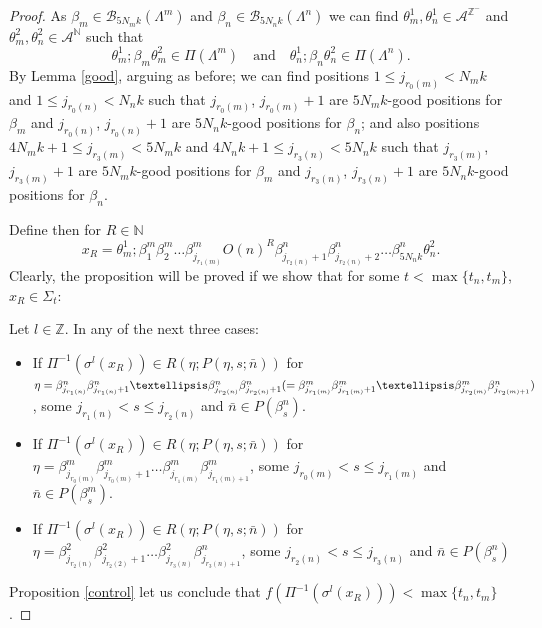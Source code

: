 \documentclass[10pt,a4paper]{amsart}
\begin{document}
\begin{proof}
As $\beta_m \in \mathcal{B}_{5N_m k}(\Lambda^{m})$ and $\beta_n \in \mathcal{B}_{5N_n k}(\Lambda^{n})$ we can find $\theta_m^{1}, \theta_n^{1}\in\mathcal{A}^{\mathbb{Z}^-}$ and $\theta_m^{2}, \theta_n^{2}\in\mathcal{A}^{\mathbb{N}}$ such that 
$$\theta_m^{1};\beta_m\theta_m^{2}\in \Pi(\Lambda^{m})\quad \mbox{and} \quad \theta_n^{1};\beta_n\theta_n^{2}\in \Pi(\Lambda^{n}).$$
By Lemma \ref{good}, arguing as before; we can find positions $1\leq j_{r_0(m)}< N_m k$ and $1\leq j_{r_0(n)}< N_n k$ such that $j_{r_0(m)}$, $j_{r_0(m)}+1$ are $5N_m k$-good positions for $\beta_m$ and $j_{r_0(n)}$, $j_{r_0(n)}+1$ are $5N_n k$-good positions for $\beta_n$; and also positions $4N_m k+1\leq j_{r_3(m)}< 5N_m k$ and $4N_n k+1\leq j_{r_3(n)}< 5N_n k$ such that $j_{r_3(m)}$, $j_{r_3(m)}+1$ are $5N_m k$-good positions for $\beta_m$ and $j_{r_3(n)}$, $j_{r_3(n)}+1$ are $5N_n k$-good positions for $\beta_n$.


Define then for $R\in \mathbb{N}$
$$x_R=\theta_m^{1};\beta^m_1\beta^m_2\dots\beta^m_{j_{r_1(m)}}O(n)^R \beta^n_{j_{r_2(n)}+1}\beta^n_{j_{r_2(n)}+2}\dots\beta^n_{5N_n k}\theta_n^{2}.$$
Clearly, the proposition will be proved if we show that for some $t<\max\{t_n,t_m\}$, $x_R\in \Sigma_{t}$:

Let $l\in \mathbb{Z}$. In any of the next three cases:

\begin{itemize}
    \item If $\Pi^{-1}(\sigma^l(x_R))\in R(\eta;P(\eta,s;\bar{n}))$ for $\eta= \beta^n_{j_{r_1(n)}}\beta^n_{j_{r_1(n)}+1}\dots \beta^n_{j_{r_2(n)}} \beta^n_{j_{r_2(n)}+1} (=\\ \beta^m_{j_{r_1(m)}}\beta^m_{j_{r_1(m)}+1}\dots \beta^m_{j_{r_2(m)}} \beta^n_{j_{r_2(m)+1}})$, some $j_{r_1(n)}< s \leq j_{r_2(n)}$ and  $\bar{n} \in P(\beta^n_s)$.
   
   \item If $\Pi^{-1}(\sigma^l(x_R))\in R(\eta;P(\eta,s;\bar{n}))$ for $\eta=\beta^m_{j_{r_0(m)}}\beta^m_{j_{r_0(m)}+1}\dots \beta^m_{j_{r_1(m)}} \beta^m_{j_{r_1(m)+1}}$, some $j_{r_0(m)}< s \leq j_{r_1(m)}$ and  $\bar{n} \in P(\beta^m_s)$.
    
  \item If $\Pi^{-1}(\sigma^l(x_R))\in R(\eta;P(\eta,s;\bar{n}))$ for $\eta=\beta^2_{j_{r_2(n)}}\beta^2_{j_{r_2(2)}+1}\dots \beta^2_{j_{r_3(n)}} \beta^n_{j_{r_3(n)+1}}$, some $j_{r_2(n)}< s \leq j_{r_3(n)}$ and  $\bar{n} \in P(\beta^n_s)$ 


\end{itemize}
Proposition \ref{control} let us conclude that $f(\Pi^{-1}(\sigma^l(x_R)))< \max\{t_n,t_m\}$.
 

\end{proof}
\end{document}
